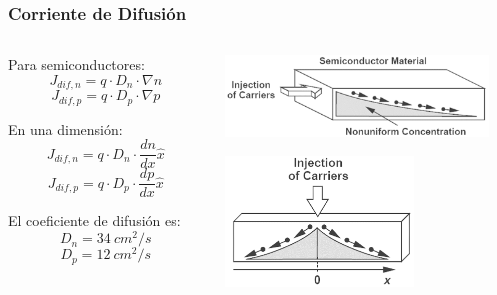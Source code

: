 \documentclass[10pt,t,aspectratio=169]{beamer}
\begin{document}
\begin{frame}[t]
    \frametitle{Corriente de Difusión}

    \begin{columns}
    
        \begin{column}{0.5\textwidth}
        
            Para semiconductores:
            \[ J_{dif,n} = q\cdot{}D_n\cdot{}\nabla{}n \]
            \[ J_{dif,p} = q\cdot{}D_p\cdot{}\nabla{}p \]

            En una dimensión:
            \[ J_{dif,n} = q\cdot{}D_n\cdot{}\dfrac{dn}{dx} \hat{x} \]
            \[ J_{dif,p} = q\cdot{}D_p\cdot{}\dfrac{dp}{dx} \hat{x} \]

            El coeficiente de difusión es:
            \[ D_n = 34\ cm^2/s \]
            \[ D_p = 12\ cm^2/s \]
            
        \end{column}
        
        \begin{column}{0.5\textwidth}
        
            \centering
            \includegraphics[width=7cm]{./figures/difusion-ej-1.png}

            \vspace{5mm}
            \includegraphics[width=5cm]{./figures/difusion-ej-2.png}
            
        \end{column}
        
    \end{columns}
    
\end{frame}
\end{document}
